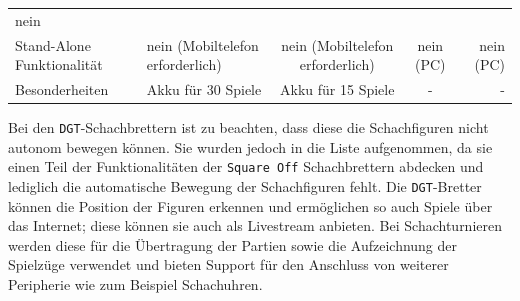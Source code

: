 \begin{longtable}[]{@{}llccr@{}}
\begin{minipage}[t]{0.13\columnwidth}
nein\strut
\end{minipage}\tabularnewline
\begin{minipage}[t]{0.19\columnwidth}\raggedright
Stand-Alone Funktionalität\strut
\end{minipage} & \begin{minipage}[t]{0.19\columnwidth}\raggedright
nein (Mobiltelefon erforderlich)\strut
\end{minipage} & \begin{minipage}[t]{0.20\columnwidth}\centering
nein (Mobiltelefon erforderlich)\strut
\end{minipage} & \begin{minipage}[t]{0.15\columnwidth}\centering
nein (PC)\strut
\end{minipage} & \begin{minipage}[t]{0.13\columnwidth}\raggedleft
nein (PC)\strut
\end{minipage}\tabularnewline
\begin{minipage}[t]{0.19\columnwidth}\raggedright
Besonderheiten\strut
\end{minipage} & \begin{minipage}[t]{0.19\columnwidth}\raggedright
Akku für 30 Spiele\strut
\end{minipage} & \begin{minipage}[t]{0.20\columnwidth}\centering
Akku für 15 Spiele\strut
\end{minipage} & \begin{minipage}[t]{0.15\columnwidth}\centering
-\strut
\end{minipage} & \begin{minipage}[t]{0.13\columnwidth}\raggedleft
-\strut
\end{minipage}\tabularnewline
\bottomrule
\end{longtable}

\pagebreak

Bei den \passthrough{\lstinline!DGT!}-Schachbrettern ist zu beachten,
dass diese die Schachfiguren nicht autonom bewegen können. Sie wurden
jedoch in die Liste aufgenommen, da sie einen Teil der Funktionalitäten
der \passthrough{\lstinline!Square Off!} Schachbrettern abdecken und
lediglich die automatische Bewegung der Schachfiguren fehlt. Die
\passthrough{\lstinline!DGT!}-Bretter können die Position der Figuren
erkennen und ermöglichen so auch Spiele über das Internet; diese können
sie auch als Livestream anbieten. Bei Schachturnieren werden diese für
die Übertragung der Partien sowie die Aufzeichnung der Spielzüge
verwendet und bieten Support für den Anschluss von weiterer Peripherie
wie zum Beispiel Schachuhren.

